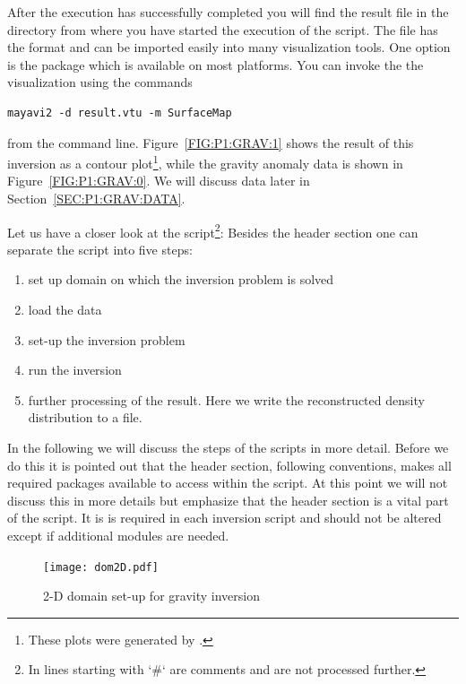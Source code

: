 After the execution has successfully completed you will find the result file
 in the directory from where you have started the execution
of the script.
The file has the \VTK format and can be imported easily into many
visualization tools.
One option is the \mayavi package which is available on most platforms.
You can invoke the the visualization using the commands
\begin{verbatim}
mayavi2 -d result.vtu -m SurfaceMap
\end{verbatim}
from the command line.
Figure~\ref{FIG:P1:GRAV:1} shows the result of this inversion as a contour
plot\footnote{These plots were generated by \VisIt.}, while the gravity
anomaly data is shown in Figure~\ref{FIG:P1:GRAV:0}.
We will discuss data later in Section~\ref{SEC:P1:GRAV:DATA}.

Let us have a closer look at the script\footnote{In \Python lines starting
with `\#` are comments and are not processed further.}: Besides the header
section one can separate the script into five steps:
\begin{enumerate}
    \item set up domain on which the inversion problem is solved
    \item load the data 
    \item set-up the inversion problem
    \item run the inversion
    \item further processing of the result. Here we write the reconstructed
          density distribution to a file.
\end{enumerate}
In the following we will discuss the steps of the scripts in more detail.
Before we do this it is pointed out that the header section, following
\Python conventions, makes all required packages available to access within
the script.
At this point we will not discuss this in more details but emphasize that the
header section is a vital part of the script.
It is is required in each \downunder inversion script and should not be
altered except if additional modules are needed.

\begin{figure}
\centering
\texttt{[image: dom2D.pdf]}
\caption{2-D domain set-up for gravity inversion}
\label{FIG:P1:GRAV:2}
\end{figure}

